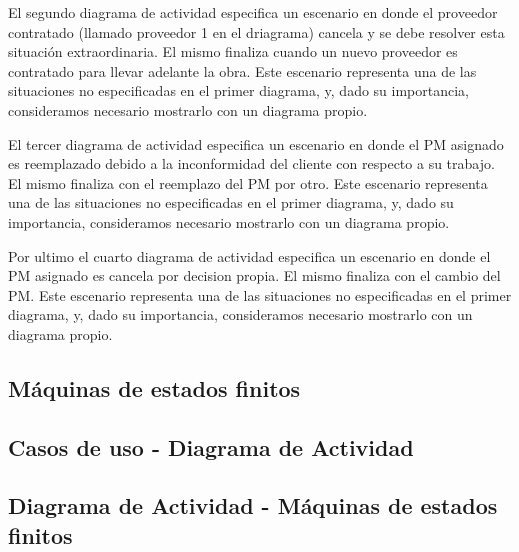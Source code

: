 El segundo diagrama de actividad especifica un escenario en donde el proveedor contratado (llamado proveedor 1 en el driagrama) cancela y se debe resolver esta situación extraordinaria. El mismo finaliza cuando un nuevo proveedor es contratado para llevar adelante la obra. Este escenario representa una de las situaciones no especificadas en el primer diagrama, y, dado su importancia, consideramos necesario mostrarlo con un diagrama propio.

El tercer diagrama de actividad especifica un escenario en donde el PM asignado es reemplazado debido a la inconformidad del cliente con respecto a su trabajo. El mismo finaliza con el reemplazo del PM por otro. Este escenario representa una de las situaciones no especificadas en el primer diagrama, y, dado su importancia, consideramos necesario mostrarlo con un diagrama propio.

Por ultimo el cuarto diagrama de actividad especifica un escenario en donde el PM asignado es cancela por decision propia. El mismo finaliza con el cambio del PM. Este escenario representa una de las situaciones no especificadas en el primer diagrama, y, dado su importancia, consideramos necesario mostrarlo con un diagrama propio.

\subsection{Máquinas de estados finitos}

\subsection{Casos de uso - Diagrama de Actividad}

\subsection{Diagrama de Actividad - Máquinas de estados finitos}
